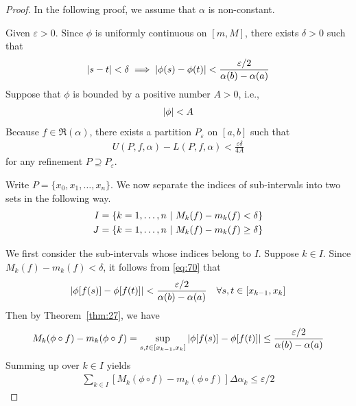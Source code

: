 \documentclass[thmcnt=section, 12pt]{my-elegantbook}
\begin{document}
\begin{proof}
    In the following proof, we assume that $\alpha$ is non-constant.

    Given $\varepsilon > 0$. Since $\phi$ is uniformly continuous on $[m, M]$, there exists $\delta > 0$ such that 
    \begin{align}
        \left\lvert s - t \right\rvert < \delta
        \implies \left\lvert \phi(s) - \phi(t) \right\rvert < \frac{\varepsilon / 2}{\alpha(b) - \alpha(a)}
        \label{eq:70}
    \end{align}
    Suppose that $\phi$ is bounded by a positive number $A > 0$, i.e., 
    \begin{align*}
        \left\lvert \phi \right\rvert < A
    \end{align*}
    Because $f \in \mathfrak{R}(\alpha)$, there exists a partition $P_\varepsilon$ on $[a, b]$ such that 
    \begin{align}
        U(P,f,\alpha) - L(P,f,\alpha) < \frac{\varepsilon \delta}{4A}
        \label{eq:71}
    \end{align}
    for any refinement $P \supseteq P_\varepsilon$.

    Write $P = \{x_0,x_1, \ldots, x_n\}$. We now separate the indices of sub-intervals into two sets in the following way.
    \begin{align*}
        I &= \left\{ k=1,\ldots,n \ \middle| \ M_k(f) - m_k(f) < \delta \right\} \\ 
        J &= \left\{ k=1,\ldots,n \ \middle| \ M_k(f) - m_k(f) \geq \delta \right\}
    \end{align*}

    We first consider the sub-intervals whose indices belong to $I$. Suppose $k \in I$. Since $M_k(f) - m_k(f) < \delta$, it follows from \eqref{eq:70} that 
    \begin{align*}
        \left\lvert \phi[f(s)] - \phi[f(t)] \right\rvert
        < \frac{\varepsilon / 2}{\alpha(b) - \alpha(a)}
        \quad \forall s,t \in [x_{k-1}, x_{k}]
    \end{align*}
    Then by Theorem~\ref{thm:27}, we have 
    \begin{align*}
        M_k(\phi \circ f) - m_k(\phi \circ f)
        = \sup_{s,t \in [x_{k-1}, x_k]} \left\lvert \phi[f(s)] - \phi[f(t)] \right\rvert
        \leq \frac{\varepsilon / 2}{\alpha(b) - \alpha(a)}
    \end{align*}
    Summing up over $k \in I$ yields
    \begin{align}
        \sum_{k \in I} \left[ M_k(\phi \circ f) - m_k(\phi \circ f) \right] \Delta \alpha_k
        \leq \varepsilon / 2
        \label{eq:72}
    \end{align}
    

\end{proof}
\end{document}
